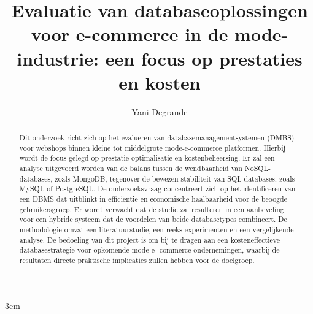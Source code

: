 \documentclass{hogent-article}
\title{Evaluatie van databaseoplossingen voor e-commerce in de mode-industrie: een focus op prestaties en kosten}
\author{Yani Degrande}
\begin{document}
\emergencystretch 3em

\begin{abstract}
    Dit onderzoek richt zich op het evalueren van databasemanagementsystemen (DMBS) voor webshops
    binnen kleine tot middelgrote mode-e-commerce platformen. Hierbij wordt de focus gelegd op
    prestatie-optimalisatie en kostenbeheersing. Er zal een analyse uitgevoerd worden van de balans
    tussen de wendbaarheid van NoSQL-databases, zoals MongoDB, tegenover de bewezen stabiliteit
    van SQL-databases, zoals MySQL of PostgreSQL. De onderzoeksvraag concentreert zich op het
    identificeren van een DBMS dat uitblinkt in efficiëntie en economische haalbaarheid voor de
    beoogde gebruikersgroep. Er wordt verwacht dat de studie zal resulteren in een aanbeveling voor
    een hybride systeem dat de voordelen van beide databasetypes combineert. De methodologie omvat
    een literatuurstudie, een reeks experimenten en een vergelijkende analyse. De bedoeling van dit
    project is om bij te dragen aan een kosteneffectieve databasestrategie voor opkomende mode-e-
    commerce ondernemingen, waarbij de resultaten directe praktische implicaties zullen hebben voor
    de doelgroep.
\end{abstract}

\tableofcontents



\printbibliography[heading=bibintoc]
\end{document}
